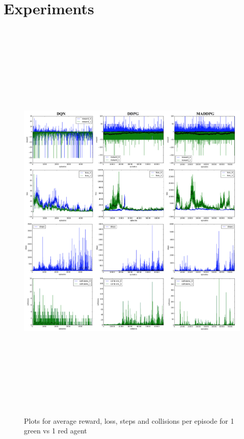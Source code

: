 
\section{Experiments}
\label{sec:experiment}

\begin{figure}[htbp]
    \vspace*{-4cm}
    \hspace*{-3.5cm} 
    \includegraphics[width=21cm, height=20cm]{1vs1}
	\caption{Plots for average reward, loss, steps and collisions per episode for 1 green vs 1 red agent}\label{Figure 2}
\end{figure}

